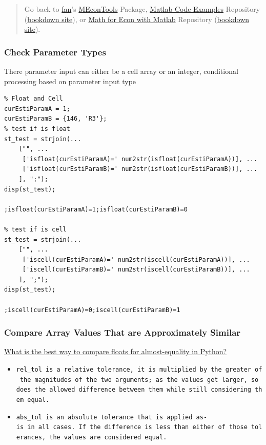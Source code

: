\documentclass[
]{book}
\begin{document}
\begin{quote}
Go back to \href{http://fanwangecon.github.io/}{fan}'s \href{https://fanwangecon.github.io/MEconTools/}{MEconTools} Package, \href{https://fanwangecon.github.io/M4Econ/}{Matlab Code Examples} Repository (\href{https://fanwangecon.github.io/M4Econ/bookdown}{bookdown site}), or \href{https://fanwangecon.github.io/Math4Econ/}{Math for Econ with Matlab} Repository (\href{https://fanwangecon.github.io/Math4Econ/bookdown}{bookdown site}).
\end{quote}

\hypertarget{check-parameter-types}{%
\subsubsection{Check Parameter Types}\label{check-parameter-types}}

There parameter input can either be a cell array or an integer,
conditional processing based on parameter input type

\begin{verbatim}
% Float and Cell
curEstiParamA = 1;
curEstiParamB = {146, 'R3'};
% test if is float
st_test = strjoin(...
    ["", ...
     ['isfloat(curEstiParamA)=' num2str(isfloat(curEstiParamA))], ...
     ['isfloat(curEstiParamB)=' num2str(isfloat(curEstiParamB))], ...
    ], ";");
disp(st_test);

;isfloat(curEstiParamA)=1;isfloat(curEstiParamB)=0

% test if is cell
st_test = strjoin(...
    ["", ...
     ['iscell(curEstiParamA)=' num2str(iscell(curEstiParamA))], ...
     ['iscell(curEstiParamB)=' num2str(iscell(curEstiParamB))], ...
    ], ";");
disp(st_test);

;iscell(curEstiParamA)=0;iscell(curEstiParamB)=1
\end{verbatim}

\hypertarget{compare-array-values-that-are-approximately-similar}{%
\subsubsection{Compare Array Values That are Approximately Similar}\label{compare-array-values-that-are-approximately-similar}}

\href{https://stackoverflow.com/a/33024979/8280804}{What is the best way to compare floats for almost-equality in
Python?}

\begin{itemize}
\item
  \texttt{rel\_tol\ is\ a\ relative\ tolerance,\ it\ is\ multiplied\ by\ the\ greater\ of\ the\ magnitudes\ of\ the\ two\ arguments;\ as\ the\ values\ get\ larger,\ so\ does\ the\ allowed\ difference\ between\ them\ while\ still\ considering\ them\ equal.}
\item
  \texttt{abs\_tol\ is\ an\ absolute\ tolerance\ that\ is\ applied\ as-is\ in\ all\ cases.\ If\ the\ difference\ is\ less\ than\ either\ of\ those\ tolerances,\ the\ values\ are\ considered\ equal.}
\end{itemize}
\end{document}
